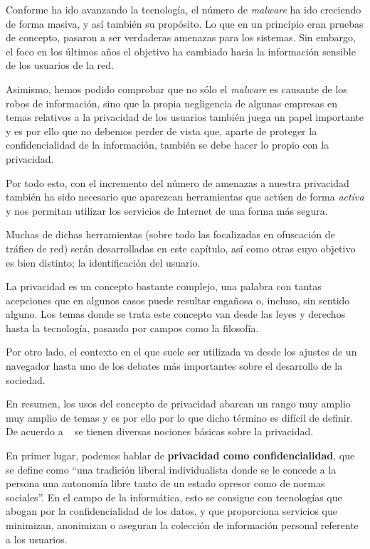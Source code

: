 Conforme ha ido avanzando la tecnología, el número de \textit{malware} ha ido creciendo de forma masiva, y así también su propósito. Lo que en un principio eran pruebas de concepto, pasaron a ser verdaderas amenazas para los sistemas. Sin embargo, el foco en los últimos años el objetivo ha cambiado hacia la información sensible de los usuarios de la red. 

Asimismo, hemos podido comprobar que no sólo el \textit{malware} es causante de los robos de información, sino que la propia negligencia de algunas empresas en temas relativos a la privacidad de los usuarios también juega un papel importante y es por ello que no debemos perder de vista que, aparte de proteger la confidencialidad de la información, también se debe hacer lo propio con la privacidad.

Por todo esto, con el incremento del número de amenazas a nuestra privacidad también ha sido necesario que aparezcan herramientas que actúen de forma \textit{activa} y nos permitan utilizar los servicios de Internet de una forma más segura.

Muchas de dichas herramientas (sobre todo las focalizadas en ofuscación de tráfico de red) serán desarrolladas en este capítulo, así como otras cuyo objetivo es bien distinto; la identificación del usuario.

\label{sec:conceptos}
La privacidad es un concepto bastante complejo, una palabra con tantas
acepciones que en algunos casos puede resultar engañosa o, incluso,
sin sentido alguno. Los temas donde se trata este concepto van desde las leyes y derechos hasta la
tecnología, pasando por campos como la
  filosofía.

Por otro lado, el contexto en el que suele ser utilizada va desde los
ajustes de un navegador hasta uno de los debates más importantes sobre
el desarrollo de la sociedad.

En resumen, los usos del concepto de privacidad abarcan un rango
muy amplio muy amplio de
temas y es por ello por lo que dicho término es difícil de definir. De
acuerdo a ~\cite{article:danezis2010} se tienen diversas nociones
básicas sobre la privacidad.

En primer lugar, podemos hablar de \textbf{privacidad como
  confidencialidad}, que se define como ``una tradición liberal
individualista donde se le concede a la persona una autonomía libre
tanto de un estado opresor como de normas sociales''. En el campo de la
informática, esto se consigue con tecnologías que abogan por la
confidencialidad de los datos, y que proporciona servicios que
minimizan, anonimizan o aseguran la colección de información personal
referente a los usuarios.

